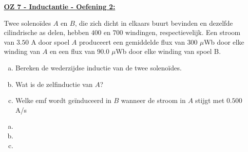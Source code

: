 \textbf{\underline{OZ 7 - Inductantie - Oefening 2:}}
\vspace{0.5cm}

Twee solenoïdes $A$ en $B$, die zich dicht in elkaars buurt bevinden en dezelfde cilindrische as delen, hebben $400$ en $700$ windingen, respectievelijk. Een stroom van $3.50$ A door spoel $A$ produceert een gemiddelde flux van $300$ $\mu$Wb door elke winding van $A$ en een flux van $90.0$ $\mu$Wb door elke winding van spoel B. 

\begin{enumerate}[(a)]
    \item Bereken de wederzijdse inductie van de twee solenoïdes.
    \item Wat is de zelfinductie van $A$?
    \item Welke emf wordt geïnduceerd in $B$ wanneer de stroom in $A$ stijgt met $0.500$ A/s
\end{enumerate}


\begin{enumerate}[(a)]
    \item 
        \begin{description}[labelwidth=1.5cm, leftmargin=!]
            \item[Geg. :] 
            \item[Gevr. :] 
            \item[Opl. :]
        \end{description}
    \item 
        \begin{description}[labelwidth=1.5cm, leftmargin=!] 
            \item[Geg. :] 
            \item[Gevr. :] 
            \item[Opl. :]
        \end{description}
    \item
        \begin{description}[labelwidth=1.5cm, leftmargin=!]
            \item[Geg. :] 
            \item[Gevr. :] 
            \item[Opl. :]
        \end{description}
\end{enumerate}

\vspace{1cm}